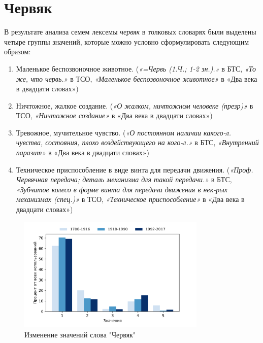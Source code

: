 \section*{Червяк}

В результате анализа семем лексемы \textit{червяк} в толковых словарях были выделены четыре группы значений,
которые можно условно сформулировать следующим образом:

\begin{enumerate}
    \item Маленькое беспозвоночное животное.
    (\textit{«=Червь (1.Ч.; 1-2 зн.).»} в БТС,
    \textit{«То же, что червь.»} в ТСО,
    \textit{«Маленькое беспозвоночное животное»} в «Два века в двадцати словах»)

    \item Ничтожное, жалкое создание.
    (\textit{«О жалком, ничтожном человеке (презр)»} в ТСО,
    \textit{«Ничтожное создание»} в «Два века в двадцати словах»)

    \item Тревожное, мучительное чувство.
    (\textit{«О постоянном наличии какого-л. чувства, состояния, плохо воздействующего на кого-л.»} в БТС,
\textit{«Внутренний паразит»} в «Два века в двадцати словах»)

    \item Техническое приспособление в виде винта для передачи движения.
    (\textit{«Проф. Червячная передача; деталь механизма для такой передачи.»} в БТС,
    \textit{«Зубчатое колесо в форме винта для передачи движения в нек-рых механизмах (спец.)»} в ТСО,
    \textit{«Техническое приспособление»} в «Два века в двадцати словах»)
\end{enumerate}

\begin{figure}[H]
	\centering
	\includegraphics[width=0.8\textwidth]{img/visualizations/chervjak_minimal}
	\caption{Изменение значений слова "Червяк"}
	\label{fig:Червяк}
\end{figure}

